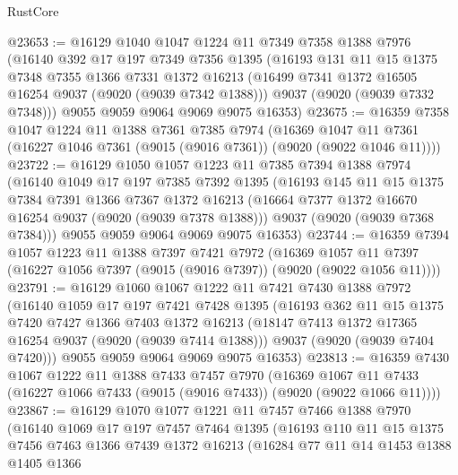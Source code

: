 \begin{lexlean}{RustCore}
\begin{coremodule}
@23653 := @16129
    @1040
    @1047
    @1224
    @11
    @7349
    @7358
    @1388
    @7976
    (@16140
      @392
      @17
      @197
      @7349
      @7356
      @1395
      (@16193
        @131
        @11
        @15
        @1375
        @7348
        @7355
        @1366
        @7331
        @1372
        @16213
        (@16499 @7341 @1372 @16505 @16254 @9037 (@9020 (@9039 @7342 @1388)))
        @9037
        (@9020 (@9039 @7332 @7348)))
      @9055
      @9059
      @9064
      @9069
      @9075
      @16353)
@23675 := @16359
    @7358
    @1047
    @1224
    @11
    @1388
    @7361
    @7385
    @7974
    (@16369 @1047 @11 @7361 (@16227 @1046 @7361 (@9015 (@9016 @7361)) (@9020 (@9022 @1046 @11))))
@23722 := @16129
    @1050
    @1057
    @1223
    @11
    @7385
    @7394
    @1388
    @7974
    (@16140
      @1049
      @17
      @197
      @7385
      @7392
      @1395
      (@16193
        @145
        @11
        @15
        @1375
        @7384
        @7391
        @1366
        @7367
        @1372
        @16213
        (@16664 @7377 @1372 @16670 @16254 @9037 (@9020 (@9039 @7378 @1388)))
        @9037
        (@9020 (@9039 @7368 @7384)))
      @9055
      @9059
      @9064
      @9069
      @9075
      @16353)
@23744 := @16359
    @7394
    @1057
    @1223
    @11
    @1388
    @7397
    @7421
    @7972
    (@16369 @1057 @11 @7397 (@16227 @1056 @7397 (@9015 (@9016 @7397)) (@9020 (@9022 @1056 @11))))
@23791 := @16129
    @1060
    @1067
    @1222
    @11
    @7421
    @7430
    @1388
    @7972
    (@16140
      @1059
      @17
      @197
      @7421
      @7428
      @1395
      (@16193
        @362
        @11
        @15
        @1375
        @7420
        @7427
        @1366
        @7403
        @1372
        @16213
        (@18147 @7413 @1372 @17365 @16254 @9037 (@9020 (@9039 @7414 @1388)))
        @9037
        (@9020 (@9039 @7404 @7420)))
      @9055
      @9059
      @9064
      @9069
      @9075
      @16353)
@23813 := @16359
    @7430
    @1067
    @1222
    @11
    @1388
    @7433
    @7457
    @7970
    (@16369 @1067 @11 @7433 (@16227 @1066 @7433 (@9015 (@9016 @7433)) (@9020 (@9022 @1066 @11))))
@23867 := @16129
    @1070
    @1077
    @1221
    @11
    @7457
    @7466
    @1388
    @7970
    (@16140
      @1069
      @17
      @197
      @7457
      @7464
      @1395
      (@16193
        @110
        @11
        @15
        @1375
        @7456
        @7463
        @1366
        @7439
        @1372
        @16213
        (@16284
          @77
          @11
          @14
          @1453
          @1388
          @1405
          @1366

\end{coremodule}
\end{lexlean}
